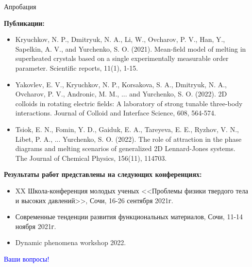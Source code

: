 \documentclass{beamer}
\begin{document}
\begin{frame}{Апробация}
\footnotesize{

\textbf{Публикации:}

\begin{itemize}
    \item Kryuchkov, N. P., Dmitryuk, N. A., Li, W., Ovcharov, P. V., Han, Y., Sapelkin, A. V., and Yurchenko, S. O. (2021). Mean-field model of melting in superheated crystals based on a single experimentally measurable order parameter. Scientific reports, 11(1), 1-15.
    \item Yakovlev, E. V., Kryuchkov, N. P., Korsakova, S. A., Dmitryuk, N. A., Ovcharov, P. V., Andronic, M. M., ... and Yurchenko, S. O. (2022). 2D colloids in rotating electric fields: A laboratory of strong tunable three-body interactions. Journal of Colloid and Interface Science, 608, 564-574.
    \item Tsiok, E. N., Fomin, Y. D., Gaiduk, E. A., Tareyeva, E. E., Ryzhov, V. N., Libet, P. A., ... Yurchenko, S. O. (2022). The role of attraction in the phase diagrams and melting scenarios of generalized 2D Lennard-Jones systems. The Journal of Chemical Physics, 156(11), 114703.
\end{itemize}


\textbf {Результаты работ представлены на следующих конференциях:}

\begin{itemize}
    \item XX Школа-конференция молодых ученых <<Проблемы физики твердого тела и высоких давлений>>, Сочи, 16-26 сентября 2021г.
    \item Современные тенденции развития функциональных материалов, Сочи, 11-14 ноября 2021г.
    \item Dynamic phenomena workshop 2022.
\end{itemize}

}
\end{frame}








\begin{frame}
    \centering \Huge \textcolor{blue}{Ваши вопросы!}
\end{frame}
\end{document}
